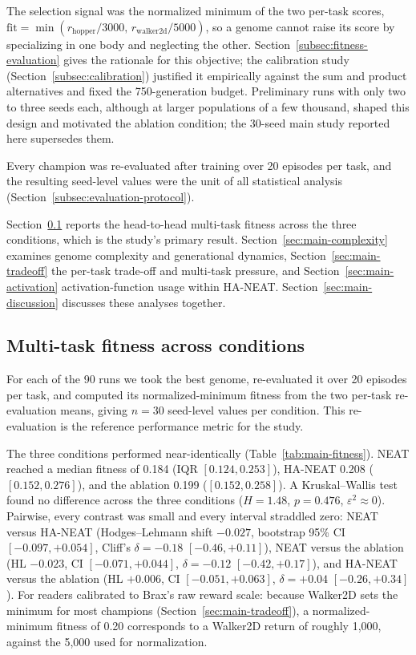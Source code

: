 \documentclass[12pt]{article}
\begin{document}
The selection signal was the normalized minimum of the two per-task scores, $\mathrm{fit} = \min(r_{\text{hopper}}/3000,\, r_{\text{walker2d}}/5000)$, so a genome cannot raise its score by specializing in one body and neglecting the other.
Section~\ref{subsec:fitness-evaluation} gives the rationale for this objective; the calibration study (Section~\ref{subsec:calibration}) justified it empirically against the sum and product alternatives and fixed the 750-generation budget.
Preliminary runs with only two to three seeds each, although at larger populations of a few thousand, shaped this design and motivated the ablation condition; the 30-seed main study reported here supersedes them.

Every champion was re-evaluated after training over 20 episodes per task, and the resulting seed-level values were the unit of all statistical analysis (Section~\ref{subsec:evaluation-protocol}).

Section~\ref{sec:main-study} reports the head-to-head multi-task fitness across the three conditions, which is the study's primary result.
Section~\ref{sec:main-complexity} examines genome complexity and generational dynamics, Section~\ref{sec:main-tradeoff} the per-task trade-off and multi-task pressure, and Section~\ref{sec:main-activation} activation-function usage within HA-NEAT.
Section~\ref{sec:main-discussion} discusses these analyses together.

\subsection{Multi-task fitness across conditions}
\label{sec:main-study}
For each of the 90 runs we took the best genome, re-evaluated it over 20 episodes per task, and computed its normalized-minimum fitness from the two per-task re-evaluation means, giving $n = 30$ seed-level values per condition.
This re-evaluation is the reference performance metric for the study.

The three conditions performed near-identically (Table~\ref{tab:main-fitness}).
NEAT reached a median fitness of 0.184 (IQR $[0.124, 0.253]$), HA-NEAT 0.208 ($[0.152, 0.276]$), and the ablation 0.199 ($[0.152, 0.258]$).
A Kruskal--Wallis test found no difference across the three conditions ($H = 1.48$, $p = 0.476$, $\varepsilon^2 \approx 0$).
Pairwise, every contrast was small and every interval straddled zero: NEAT versus HA-NEAT (Hodges--Lehmann shift $-0.027$, bootstrap 95\% CI $[-0.097, +0.054]$, Cliff's $\delta = -0.18$ $[-0.46, +0.11]$), NEAT versus the ablation (HL $-0.023$, CI $[-0.071, +0.044]$, $\delta = -0.12$ $[-0.42, +0.17]$), and HA-NEAT versus the ablation (HL $+0.006$, CI $[-0.051, +0.063]$, $\delta = +0.04$ $[-0.26, +0.34]$).
For readers calibrated to Brax's raw reward scale: because Walker2D sets the minimum for most champions (Section~\ref{sec:main-tradeoff}), a normalized-minimum fitness of 0.20 corresponds to a Walker2D return of roughly 1{,}000, against the 5{,}000 used for normalization.
\end{document}
